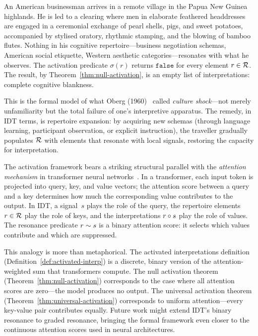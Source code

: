 \begin{example}
\label{ex:culture-shock}
An American businessman arrives in a remote village in the Papua New
Guinea highlands.  He is led to a clearing where men in elaborate
feathered headdresses are engaged in a ceremonial exchange of pearl
shells, pigs, and sweet potatoes, accompanied by stylised oratory,
rhythmic stamping, and the blowing of bamboo flutes.  Nothing in his
cognitive repertoire---business negotiation schemas, American social
etiquette, Western aesthetic categories---resonates with what he
observes.  The activation predicate $\sigma(r)$ returns
$\mathtt{false}$ for every element $r \in \mathcal{R}$.  The result, by
Theorem~\ref{thm:null-activation}, is an empty list of
interpretations: complete cognitive blankness.

This is the formal model of what Oberg (1960)~\cite{oberg1960} called
\emph{culture shock}---not merely unfamiliarity but the total failure
of one's interpretive apparatus.  The remedy, in IDT terms, is
repertoire expansion: by acquiring new schemas (through language
learning, participant observation, or explicit instruction), the
traveller gradually populates $\mathcal{R}$ with elements that resonate with
local signals, restoring the capacity for interpretation.
\end{example}

\begin{remark}
\label{rem:attention-ai}
The activation framework bears a striking structural parallel with the
\emph{attention mechanism} in transformer neural
networks~\cite{vaswani2017}.  In a transformer, each input token is
projected into query, key, and value vectors; the attention score
between a query and a key determines how much the corresponding value
contributes to the output.  In IDT, a signal~$s$ plays the role of
the query, the repertoire elements~$r \in \mathcal{R}$ play the role of keys,
and the interpretations $r \circ s$ play the role of values.  The
resonance predicate $r \sim s$ is a binary attention score:
it selects which values contribute and which are suppressed.

This analogy is more than metaphorical.  The activated interpretations
definition (Definition~\ref{def:activated-interp}) is a discrete,
binary version of the attention-weighted sum that transformers
compute.  The null activation theorem
(Theorem~\ref{thm:null-activation}) corresponds to the case where all
attention scores are zero---the model produces no output.  The
universal activation theorem
(Theorem~\ref{thm:universal-activation}) corresponds to uniform
attention---every key-value pair contributes equally.  Future work
might extend IDT's binary resonance to graded resonance, bringing the
formal framework even closer to the continuous attention scores used
in neural architectures.
\end{remark}

